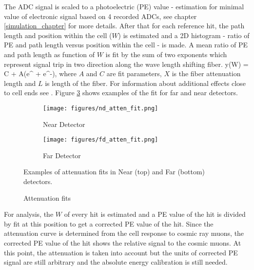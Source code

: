 The ADC signal is scaled to a photoelectric (PE) value - estimation for minimal value of electronic signal based on 4 recorded 
ADCs, see chapter \ref{simulation_chapter} for more details. After that for each reference hit, the path length 
and position within the cell ($W$) is estimated and a 2D histogram - ratio of PE and path length versus position 
within the cell - is made. A mean ratio of PE and path length as function of $W$ is fit by the sum of two exponents
which represent signal trip in two direction along the wave length shifting fiber.
\be
y(W) = C + A\Big(e^{} + e^{-}\Big),
\ee
where $A$ and $C$ are fit parameters, $X$ is the fiber attenuation length and $L$ is length of the fiber. For
information about additional effects close to cell ends see \cite{calib_technote}. Figure \ref{fig:att_fit} shows 
examples of the fit for far and near detectors.
\begin{figure}[t!]
\begin{subfigure}[t]{0.9\textwidth}
  \centering
  \texttt{[image: figures/nd\_atten\_fit.png]}
  \caption{Near Detector}
  \label{fig:att_fit_nd}
\end{subfigure}
\vspace{0.5cm}
\newline
\begin{subfigure}[t]{0.9\textwidth}
  \centering
  \texttt{[image: figures/fd\_atten\_fit.png]}
  \caption{Far Detector}
  \label{fig:att_fitt_fd}
\end{subfigure}
\caption{Attenuation fits}
{Examples of attenuation fits in Near (top) and Far (bottom) detectors.}
\label{fig:att_fit}
\end{figure}

For analysis, the $W$ of every hit is estimated and a PE value of the hit is divided by fit at this position to 
get a corrected PE value of the hit. Since the attenuation curve is determined from the cell response to cosmic 
ray muons, the corrected PE value of the hit shows the relative signal to the cosmic muons. At this point, the 
attenuation is taken into account but the units of corrected PE signal are still arbitrary and the absolute energy 
calibration is still needed. 

